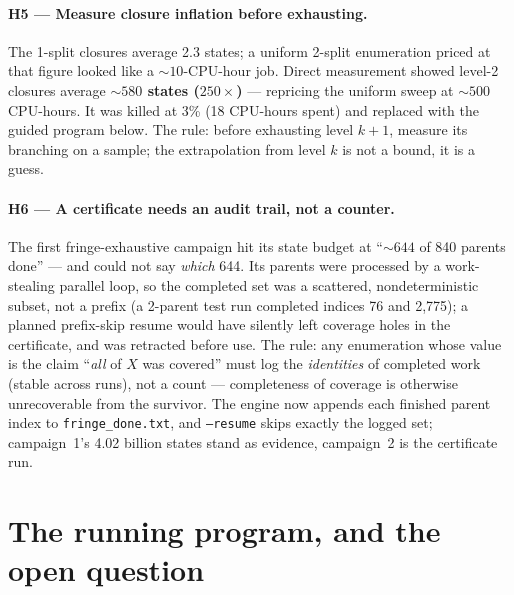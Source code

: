 \documentclass[10pt]{article}
\begin{document}
\paragraph{H5 --- Measure closure inflation before exhausting.} The
1-split closures average 2.3 states; a uniform 2-split enumeration
priced at that figure looked like a ${\sim}10$-CPU-hour job. Direct
measurement showed level-2 closures average \textbf{${\sim}580$ states
($250\times$)} --- repricing the uniform sweep at ${\sim}500$
CPU-hours. It was killed at 3\% (18 CPU-hours spent) and replaced with
the guided program below. The rule: before exhausting level $k{+}1$,
measure its branching on a sample; the extrapolation from level $k$ is
not a bound, it is a guess.

\paragraph{H6 --- A certificate needs an audit trail, not a counter.}
The first fringe-exhaustive campaign hit its state budget at
``${\sim}644$ of 840 parents done'' --- and could not say
\emph{which} 644. Its parents were processed by a work-stealing
parallel loop, so the completed set was a scattered, nondeterministic
subset, not a prefix (a 2-parent test run completed indices 76 and
2{,}775); a planned prefix-skip resume would have silently left
coverage holes in the certificate, and was retracted before use. The
rule: any enumeration whose value is the claim ``\emph{all} of $X$
was covered'' must log the \emph{identities} of completed work
(stable across runs), not a count --- completeness of coverage is
otherwise unrecoverable from the survivor. The engine now appends
each finished parent index to \texttt{fringe\_done.txt}, and
\texttt{--resume} skips exactly the logged set; campaign~1's 4.02
billion states stand as evidence, campaign~2 is the certificate run.

\section{The running program, and the open question}\label{sec:prog}
\end{document}
